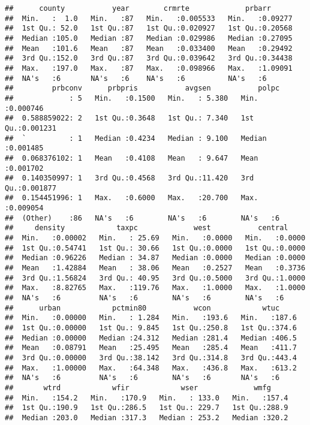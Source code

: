 \documentclass[]{article}
\begin{document}
\begin{verbatim}
##      county           year        crmrte             prbarr       
##  Min.   :  1.0   Min.   :87   Min.   :0.005533   Min.   :0.09277  
##  1st Qu.: 52.0   1st Qu.:87   1st Qu.:0.020927   1st Qu.:0.20568  
##  Median :105.0   Median :87   Median :0.029986   Median :0.27095  
##  Mean   :101.6   Mean   :87   Mean   :0.033400   Mean   :0.29492  
##  3rd Qu.:152.0   3rd Qu.:87   3rd Qu.:0.039642   3rd Qu.:0.34438  
##  Max.   :197.0   Max.   :87   Max.   :0.098966   Max.   :1.09091  
##  NA's   :6       NA's   :6    NA's   :6          NA's   :6        
##         prbconv      prbpris           avgsen           polpc         
##             : 5   Min.   :0.1500   Min.   : 5.380   Min.   :0.000746  
##  0.588859022: 2   1st Qu.:0.3648   1st Qu.: 7.340   1st Qu.:0.001231  
##  `          : 1   Median :0.4234   Median : 9.100   Median :0.001485  
##  0.068376102: 1   Mean   :0.4108   Mean   : 9.647   Mean   :0.001702  
##  0.140350997: 1   3rd Qu.:0.4568   3rd Qu.:11.420   3rd Qu.:0.001877  
##  0.154451996: 1   Max.   :0.6000   Max.   :20.700   Max.   :0.009054  
##  (Other)    :86   NA's   :6        NA's   :6        NA's   :6         
##     density            taxpc             west           central      
##  Min.   :0.00002   Min.   : 25.69   Min.   :0.0000   Min.   :0.0000  
##  1st Qu.:0.54741   1st Qu.: 30.66   1st Qu.:0.0000   1st Qu.:0.0000  
##  Median :0.96226   Median : 34.87   Median :0.0000   Median :0.0000  
##  Mean   :1.42884   Mean   : 38.06   Mean   :0.2527   Mean   :0.3736  
##  3rd Qu.:1.56824   3rd Qu.: 40.95   3rd Qu.:0.5000   3rd Qu.:1.0000  
##  Max.   :8.82765   Max.   :119.76   Max.   :1.0000   Max.   :1.0000  
##  NA's   :6         NA's   :6        NA's   :6        NA's   :6       
##      urban            pctmin80           wcon            wtuc      
##  Min.   :0.00000   Min.   : 1.284   Min.   :193.6   Min.   :187.6  
##  1st Qu.:0.00000   1st Qu.: 9.845   1st Qu.:250.8   1st Qu.:374.6  
##  Median :0.00000   Median :24.312   Median :281.4   Median :406.5  
##  Mean   :0.08791   Mean   :25.495   Mean   :285.4   Mean   :411.7  
##  3rd Qu.:0.00000   3rd Qu.:38.142   3rd Qu.:314.8   3rd Qu.:443.4  
##  Max.   :1.00000   Max.   :64.348   Max.   :436.8   Max.   :613.2  
##  NA's   :6         NA's   :6        NA's   :6       NA's   :6      
##       wtrd            wfir            wser             wmfg      
##  Min.   :154.2   Min.   :170.9   Min.   : 133.0   Min.   :157.4  
##  1st Qu.:190.9   1st Qu.:286.5   1st Qu.: 229.7   1st Qu.:288.9  
##  Median :203.0   Median :317.3   Median : 253.2   Median :320.2  

\end{verbatim}
\end{document}
